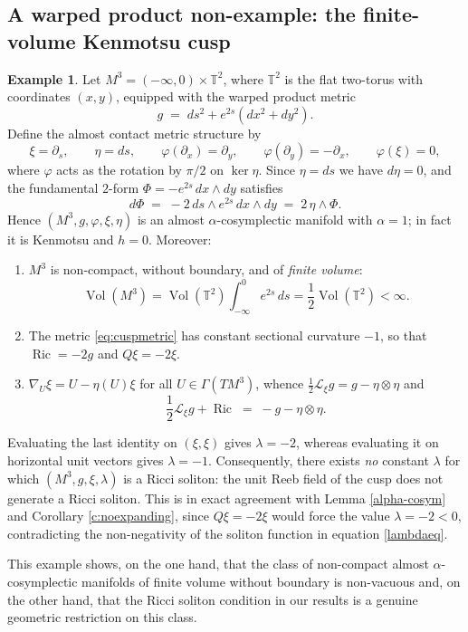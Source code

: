 \documentclass[a4paper, twoside, 10pt]{article}
\numberwithin{equation}{section}
\theoremstyle{definition}
\newtheorem{example}{Example}[section]
\begin{document}
\subsection{A warped product non-example: the finite-volume Kenmotsu cusp}

\begin{example}\label{ex:cusp}
Let $M^{3}=(-\infty,0)\times\mathbb{T}^{2}$, where $\mathbb{T}^{2}$ is
the flat two-torus with coordinates $(x,y)$, equipped with the warped
product metric
\begin{equation}\label{eq:cuspmetric}
g \;=\; ds^{2}+e^{2s}\left(dx^{2}+dy^{2}\right).
\end{equation}
Define the almost contact metric structure by
\[
\xi=\partial_{s},\qquad
\eta=ds,\qquad
\varphi(\partial_{x})=\partial_{y},\qquad
\varphi(\partial_{y})=-\partial_{x},\qquad
\varphi(\xi)=0 ,
\]
where $\varphi$ acts as the rotation by $\pi/2$ on $\ker\eta$. Since
$\eta=ds$ we have $d\eta=0$, and the fundamental $2$-form
$\Phi=-e^{2s}\,dx\wedge dy$ satisfies
\[
d\Phi \;=\; -2\,ds\wedge e^{2s}\,dx\wedge dy \;=\; 2\,\eta\wedge\Phi .
\]
Hence $\left(M^{3},g,\varphi,\xi,\eta\right)$ is an almost
$\alpha$-cosymplectic manifold with $\alpha=1$; in fact it is Kenmotsu
and $h=0$. Moreover:
\begin{enumerate}
\item[(i)] $M^{3}$ is non-compact, without boundary, and of
\emph{finite volume}:
\[
\operatorname{Vol}\left(M^{3}\right)
=\operatorname{Vol}\left(\mathbb{T}^{2}\right)
\int_{-\infty}^{0}e^{2s}\,ds
=\frac{1}{2}\operatorname{Vol}\left(\mathbb{T}^{2}\right)<\infty .
\]
\item[(ii)] The metric \eqref{eq:cuspmetric} has constant sectional
curvature $-1$, so that $\operatorname{Ric}=-2g$ and $Q\xi=-2\xi$.
\item[(iii)] $\nabla_{U}\xi=U-\eta(U)\xi$ for all
$U\in\Gamma\left(TM^{3}\right)$, whence
$\frac{1}{2}\mathcal{L}_{\xi}g=g-\eta\otimes\eta$ and
\[
\frac{1}{2}\mathcal{L}_{\xi}g+\operatorname{Ric}\;=\; -g-\eta\otimes\eta .
\]
\end{enumerate}
Evaluating the last identity on $(\xi,\xi)$ gives $\lambda=-2$,
whereas evaluating it on horizontal unit vectors gives $\lambda=-1$.
Consequently, there exists \emph{no} constant $\lambda$ for which
$\left(M^{3},g,\xi,\lambda\right)$ is a Ricci soliton: the unit Reeb
field of the cusp does not generate a Ricci soliton. This is in exact
agreement with Lemma \ref{alpha-cosym} and Corollary
\ref{c:noexpanding}, since $Q\xi=-2\xi$ would force the value
$\lambda=-2<0$, contradicting the non-negativity of the soliton
function in equation \eqref{lambdaeq}.

This example shows, on the one hand, that the class of non-compact
almost $\alpha$-cosymplectic manifolds of finite volume without
boundary is non-vacuous and, on the other hand, that the Ricci soliton
condition in our results is a genuine geometric restriction on this
class.
\end{example}
\end{document}
